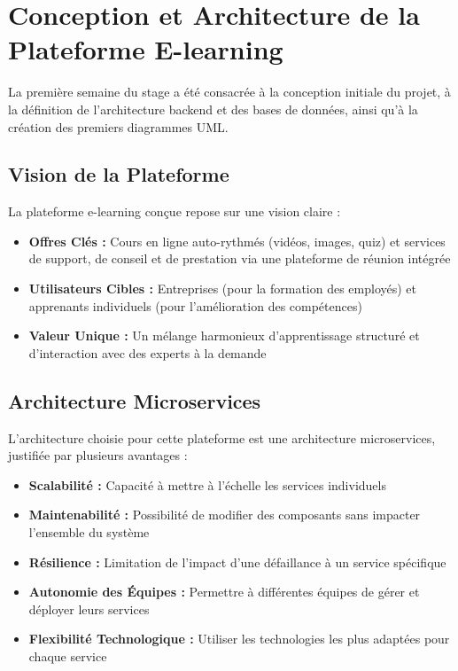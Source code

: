 \documentclass[12pt, a4paper]{report}
\begin{document}
\chapter{Conception et Architecture de la Plateforme E-learning}
\thispagestyle{fancy}

La première semaine du stage a été consacrée à la conception initiale du projet, à la définition de l'architecture backend et des bases de données, ainsi qu'à la création des premiers diagrammes UML.

\section{Vision de la Plateforme}
La plateforme e-learning conçue repose sur une vision claire :
\begin{itemize}
  \item \textbf{Offres Clés :} Cours en ligne auto-rythmés (vidéos, images, quiz) et services de support, de conseil et de prestation via une plateforme de réunion intégrée
  \item \textbf{Utilisateurs Cibles :} Entreprises (pour la formation des employés) et apprenants individuels (pour l'amélioration des compétences)
  \item \textbf{Valeur Unique :} Un mélange harmonieux d'apprentissage structuré et d'interaction avec des experts à la demande
\end{itemize}

\section{Architecture Microservices}
L'architecture choisie pour cette plateforme est une architecture microservices, justifiée par plusieurs avantages :
\begin{itemize}
  \item \textbf{Scalabilité :} Capacité à mettre à l'échelle les services individuels
  \item \textbf{Maintenabilité :} Possibilité de modifier des composants sans impacter l'ensemble du système
  \item \textbf{Résilience :} Limitation de l'impact d'une défaillance à un service spécifique
  \item \textbf{Autonomie des Équipes :} Permettre à différentes équipes de gérer et déployer leurs services
  \item \textbf{Flexibilité Technologique :} Utiliser les technologies les plus adaptées pour chaque service
\end{itemize}
\end{document}
